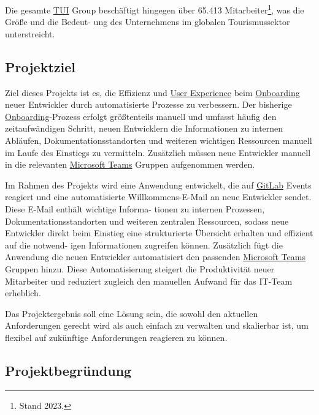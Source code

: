 Die gesamte \hyperlink{TUI}{\textcolor{AOBlau}{TUI}} Group beschäftigt hingegen über 65.413 Mitarbeiter\footnote{Stand 2023.}, was die Größe und die Bedeut-
ung des Unternehmens im globalen Tourismussektor unterstreicht.


\subsection{Projektziel} 
\label{sec:Projektziel}

Ziel dieses Projekts ist es, die Effizienz und \hyperlink{UserExperience}{\textcolor{AOBlau}{User Experience}} beim \hyperlink{Onboarding}{\textcolor{AOBlau}{Onboarding}} neuer Entwickler durch automatisierte Prozesse zu verbessern. Der bisherige \hyperlink{Onboarding}{\textcolor{AOBlau}{Onboarding}}-Prozess erfolgt größtenteils manuell und umfasst häufig den zeitaufwändigen Schritt, neuen Entwicklern die Informationen zu internen Abläufen, Dokumentationsstandorten und weiteren wichtigen Ressourcen manuell im Laufe des Einstiegs zu vermitteln. Zusätzlich müssen neue Entwickler manuell in die relevanten \hyperlink{MicrosoftTeams}{\textcolor{AOBlau}{Microsoft Teams}} Gruppen aufgenommen werden. 

Im Rahmen des Projekts wird eine Anwendung entwickelt, die auf \hyperlink{GitLab}{\textcolor{AOBlau}{GitLab}} Events reagiert und eine automatisierte Willkommens-E-Mail an neue Entwickler sendet. Diese E-Mail enthält wichtige Informa-
tionen zu internen Prozessen, Dokumentationsstandorten und weiteren zentralen Ressourcen, sodass neue Entwickler direkt beim Einstieg eine strukturierte Übersicht erhalten und effizient auf die notwend-
igen Informationen zugreifen können. Zusätzlich fügt die Anwendung die neuen Entwickler automatisiert den passenden \hyperlink{MicrosoftTeams}{\textcolor{AOBlau}{Microsoft Teams}} Gruppen hinzu. Diese Automatisierung steigert die Produktivität neuer Mitarbeiter und reduziert zugleich den manuellen Aufwand für das IT-Team erheblich.

Das Projektergebnis soll eine Lösung sein, die sowohl den aktuellen Anforderungen gerecht wird als auch einfach zu verwalten und skalierbar ist, um flexibel auf zukünftige Anforderungen reagieren zu können.

\subsection{Projektbegründung} 
\label{sec:Projektbegruendung}

